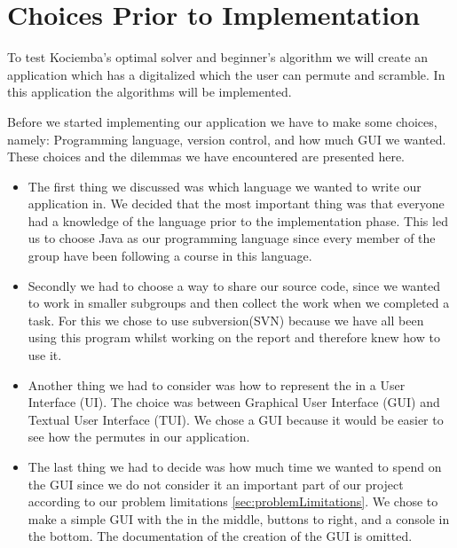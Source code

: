 \chapter{Choices Prior to Implementation}

To test Kociemba's optimal solver and beginner's algorithm we will create an application which has a digitalized \rubik{} which the user can permute and scramble.
In this application the algorithms will be implemented.

Before we started implementing our application we have to make some choices, namely: Programming language, version control, and how much GUI we wanted.
These choices and the dilemmas we have encountered are presented here.

\begin{itemize}
	\item The first thing we discussed was which language we wanted to write our application in.
We decided that the most important thing was that everyone had a knowledge of the language prior to the implementation phase.
This led us to choose Java as our programming language since every member of the group have been following a course in this language.

	\item Secondly we had to choose a way to share our source code, since we wanted to work in smaller subgroups and then collect the work when we completed a task.
For this we chose to use subversion(SVN) because we have all been using this program whilst working on the report and therefore knew how to use it.

	\item Another thing we had to consider was how to represent the \rubik{} in a User Interface (UI). The choice was between Graphical User Interface (GUI) and Textual User Interface (TUI). We chose a GUI because it would be easier to see how the \rubik{} permutes in our application.  
	\item The last thing we had to decide was how much time we wanted to spend on the GUI since we do not consider it an important part of our project according to our problem limitations \ref{sec:problemLimitations}.
We chose to make a simple GUI with the \rubik{} in the middle, buttons to right, and a console in the bottom.
The documentation of the creation of the GUI is omitted.
\end{itemize}
